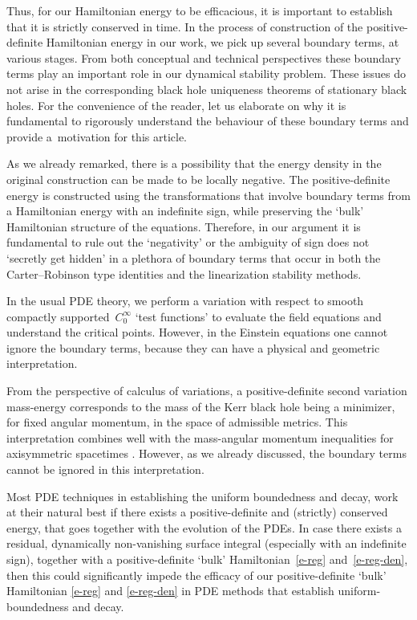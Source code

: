 \documentclass[pdftex]{sigma}
\numberwithin{equation}{section}
\begin{document}
Thus, for our Hamiltonian energy to be efficacious, it is important to establish that it is strictly conserved in time. In the process of construction of the positive-definite Hamiltonian energy in our work, we pick up several boundary terms, at various stages. From both conceptual and technical perspectives these boundary terms play an important role in our dynamical stability problem. These issues do not arise in the corresponding black hole uniqueness theorems of stationary black holes. For the convenience of the reader, let us elaborate on why it is fundamental to rigorously understand the behaviour of these boundary terms and provide a~motivation for this article.

 As we already remarked, there is a possibility that the energy density in the original construction can be made to be locally negative. The positive-definite energy is constructed using the transformations that involve boundary terms from a Hamiltonian energy with an indefinite sign, while preserving the `bulk' Hamiltonian structure of the equations. Therefore, in our argument it is fundamental to rule out the `negativity' or the ambiguity of sign does not `secretly get hidden' in a plethora of boundary terms that occur in both the Carter--Robinson type identities and the linearization stability methods.

 In the usual PDE theory, we perform a variation with respect to smooth compactly supported~$C^\infty_0$ `test functions' to evaluate the field equations and understand the critical points. However, in the Einstein equations one cannot ignore the boundary terms, because they can have a physical and geometric interpretation.

 From the perspective of calculus of variations, a positive-definite second variation mass-energy corresponds to the mass of the Kerr black hole being a minimizer, for fixed angular momentum, in the space of admissible metrics. This interpretation combines well with the mass-angular momentum inequalities for axisymmetric spacetimes \cite{D09}. However, as we already discussed, the boundary terms cannot be ignored in this interpretation.

 Most PDE techniques in establishing the uniform boundedness and decay, work at their natural best if there exists a positive-definite and (strictly) conserved energy, that goes together with the evolution of the PDEs. In case there exists a residual, dynamically non-vanishing surface integral (especially with an indefinite sign), together with a positive-definite `bulk' Hamiltonian~\eqref{e-reg} and~\eqref{e-reg-den}, then this could significantly impede the efficacy of our positive-definite `bulk' Hamiltonian \eqref{e-reg} and \eqref{e-reg-den} in PDE methods that establish uniform-boundedness and decay.
\end{document}
